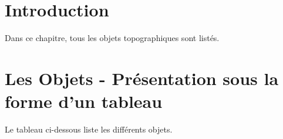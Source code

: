 \documentclass[12pt,titlepage]{book}
\begin{document}
\section{Introduction}
Dans ce chapitre, tous les objets topographiques sont listés.


\section{Les Objets - Présentation sous la forme d'un tableau}
Le tableau ci-dessous liste les différents objets.
\vspace{\baselineskip}
\end{document}
